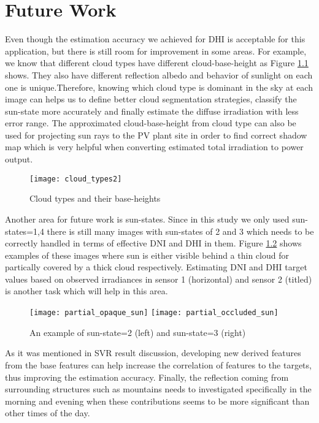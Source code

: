 \chapter{Future Work}
\label{sec:future_work_chapter}
Even though the estimation accuracy we achieved for DHI is acceptable for this application, but there is still room for improvement in some areas. For example, 
we know that different cloud types have different cloud-base-height as Figure \ref{fig:cloud_type} shows. They also have different reflection albedo and behavior of sunlight on each one is unique.Therefore, knowing which cloud type is dominant in the sky at each image can helps us to define better cloud segmentation strategies, classify the sun-state more accurately and finally estimate the diffuse irradiation with less error range. The approximated cloud-base-height from cloud type can also be used for projecting sun rays to the PV plant site in order to find correct shadow map which is very helpful when converting estimated total irradiation to power output.

\begin{figure}[h!]
\caption{Cloud types and their base-heights}
\label{fig:cloud_type}
\texttt{[image: cloud\_types2]}
\centering
\end{figure}

Another area for future work is sun-states. Since in this study we only used sun-states=1,4 there is still many images with sun-states of 2 and 3 which needs to be correctly handled in terms of effective DNI and DHI in them. Figure \ref{fig:img_state_2} shows examples of these images where sun is either visible behind a thin cloud for partically covered by a thick cloud respectively. Estimating DNI and DHI target values based on observed irradiances in sensor 1 (horizontal) and sensor 2 (titled) is another task which will help in this area.

\begin{figure}[h!]
\caption{An example of sun-state=2 (left) and sun-state=3 (right)}
\label{fig:img_state_2}
\texttt{[image: partial\_opaque\_sun]}
\texttt{[image: partial\_occluded\_sun]}
\centering
\end{figure}


As it was mentioned in SVR result discussion, developing new derived features from the base features can help increase the correlation of features to the targets, thus improving the estimation accuracy. Finally, the reflection coming from surrounding structures such as mountains needs to investigated specifically in the morning and evening when these contributions seems to be more significant than other times of the day.